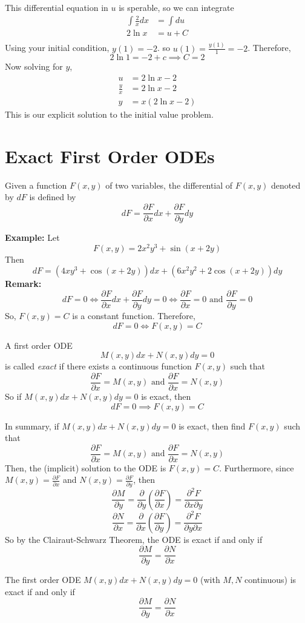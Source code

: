 \documentclass[openany]{report}
\begin{document}
This differential equation in $u$ is sperable, so we can integrate 
\begin{align*}
    \int \frac{2}{x}dx &= \int du\\
    2\ln x &= u + C\\
\end{align*}
Using your initial condition, $y(1) = -2$. so $u(1) = \frac{y(1)}{1} = -2$. Therefore,
\[2\ln 1 = -2 + c \implies C = 2\]
Now solving for $y$, 
\begin{align*}
    u &= 2\ln x - 2\\
    \frac{y}{x} &= 2\ln x - 2\\
    y &= x(2\ln x - 2)
\end{align*}
This is our explicit solution to the initial value problem. 
\section{Exact First Order ODEs}
\begin{definition}
    Given a function $F(x,y)$ of two variables, the differential of $F(x,y)$ denoted by $dF$ is defined by 
    \[dF = \frac{\partial F}{\partial x} dx + \frac{\partial F}{\partial y}dy\]
\end{definition}
\noindent
\textbf{Example:} Let 
\[F(x,y) = 2x^2y^3 + \sin(x+2y)\]
Then 
\[dF = (4xy^3 + \cos(x+2y))dx + (6x^2y^2 + 2\cos(x+2y))dy\]
\textbf{Remark:}
\[dF = 0 \iff \frac{\partial F}{\partial x} dx + \frac{\partial F}{\partial y} dy = 0 \iff \frac{\partial F}{\partial x} = 0 \text{ and } \frac{\partial F}{\partial y} = 0 \]
So, $F(x,y) = C$ is a constant function. Therefore, 
\[dF = 0 \iff F(x,y) = C\]
\begin{definition}
    A first order ODE 
    \[M(x,y)dx + N(x,y)dy = 0\]
    is called \emph{exact} if there exists a continuous function $F(x,y)$ such that 
    \[\frac{\partial F}{\partial x} = M(x,y) \text{ and } \frac{\partial F}{\partial x} = N(x,y)\]
    So if $M(x,y)dx + N(x,y)dy = 0$ is exact, then 
    \[dF = 0 \implies F(x,y) = C\]
\end{definition}
In summary, if $M(x,y)dx + N(x,y)dy = 0$ is exact, then find $F(x,y)$ such that
\[\frac{\partial F}{\partial x} = M(x,y) \text{ and } \frac{\partial F}{\partial x} = N(x,y)\]
Then, the (implicit) solution to the ODE is $F(x,y) = C$. Furthermore, since $M(x,y) = \frac{\partial F}{\partial x}$ and $N(x,y) = \frac{\partial F}{\partial y}$, then 
\[\frac{\partial M}{\partial y} = \frac{\partial}{\partial y} \left(\frac{\partial F}{\partial x}\right) = \frac{\partial^2F}{\partial x \partial y}\]
\[\frac{\partial N}{\partial x} = \frac{\partial}{\partial x} \left(\frac{\partial F}{\partial y}\right) = \frac{\partial^2F}{\partial y \partial x}\]
So by the Clairaut-Schwarz Theorem, the ODE is exact if and only if
\[\frac{\partial M}{\partial y} = \frac{\partial N}{\partial x}\]
\begin{theorem}
    The first order ODE $M(x,y)dx + N(x,y)dy = 0$ (with $M,N$ continuous) is exact if and only if
    \[\frac{\partial M}{\partial y} = \frac{\partial N}{\partial x}\]
\end{theorem}
\end{document}
